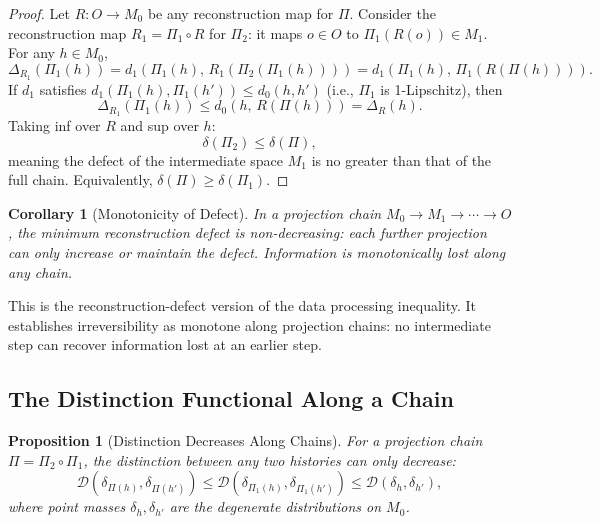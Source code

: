 \documentclass[12pt,a4paper]{article}
\newtheorem{corollary}[theorem]{Corollary}
\newtheorem{proposition}[theorem]{Proposition}
\theoremstyle{remark}
\theoremstyle{definition}
\begin{document}
\begin{proof}
Let $R : O \to M_0$ be any reconstruction map for $\Pi$. Consider
the reconstruction map $R_1 = \Pi_1 \circ R$ for $\Pi_2$: it maps
$o \in O$ to $\Pi_1(R(o)) \in M_1$. For any $h \in M_0$,
\begin{equation*}
  \Delta_{R_1}(\Pi_1(h))
  = d_1(\Pi_1(h),\, R_1(\Pi_2(\Pi_1(h))))
  = d_1(\Pi_1(h),\, \Pi_1(R(\Pi(h)))).
\end{equation*}
If $d_1$ satisfies $d_1(\Pi_1(h), \Pi_1(h')) \leq d_0(h, h')$
(i.e., $\Pi_1$ is 1-Lipschitz), then
\begin{equation*}
  \Delta_{R_1}(\Pi_1(h)) \leq d_0(h,\, R(\Pi(h))) = \Delta_R(h).
\end{equation*}
Taking inf over $R$ and sup over $h$:
\begin{equation*}
  \delta(\Pi_2) \leq \delta(\Pi),
\end{equation*}
meaning the defect of the intermediate space $M_1$ is no greater than
that of the full chain. Equivalently, $\delta(\Pi) \geq \delta(\Pi_1)$.
\end{proof}

\begin{corollary}[Monotonicity of Defect]
In a projection chain $M_0 \to M_1 \to \cdots \to O$, the minimum
reconstruction defect is non-decreasing: each further projection can
only increase or maintain the defect. Information is monotonically
lost along any chain.
\end{corollary}

This is the reconstruction-defect version of the data processing
inequality. It establishes irreversibility as monotone along projection
chains: no intermediate step can recover information lost at an earlier
step.

\subsection{The Distinction Functional Along a Chain}

\begin{proposition}[Distinction Decreases Along Chains]
For a projection chain $\Pi = \Pi_2 \circ \Pi_1$, the distinction
between any two histories can only decrease:
\begin{equation}
  \mathcal{D}(\delta_{\Pi(h)}, \delta_{\Pi(h')})
  \leq \mathcal{D}(\delta_{\Pi_1(h)}, \delta_{\Pi_1(h')})
  \leq \mathcal{D}(\delta_h, \delta_{h'}),
\end{equation}
where point masses $\delta_h, \delta_{h'}$ are the degenerate distributions
on $M_0$.
\end{proposition}
\end{document}
